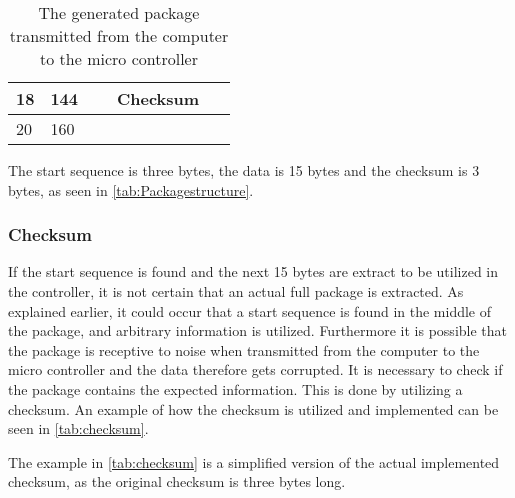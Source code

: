 \begin{table}[H]
\begin{tabular}{llclllllllllllllll}
\multicolumn{1}{|l|}{18}   & \multicolumn{1}{l|}{144} & \multicolumn{16}{c|}{Checksum}                                                                                                                                                                                                                                                                                                                                                                                      \\ \hline
\multicolumn{1}{|l|}{20}   & \multicolumn{1}{l|}{160} & \multicolumn{8}{c|}{}                                                                                                                                                                                 & \multicolumn{1}{l|}{}  & \multicolumn{1}{l|}{}  & \multicolumn{1}{l|}{}   & \multicolumn{1}{l|}{}   & \multicolumn{1}{l|}{}   & \multicolumn{1}{l|}{}   & \multicolumn{1}{l|}{}   & \multicolumn{1}{l|}{}   \\ \hline
\end{tabular}
\caption{The generated package transmitted from the computer to the micro controller}
\label{tab:Packagestructure}
\end{table}

The start sequence is three bytes, the data is 15 bytes and the checksum is 3 bytes, as seen in \autoref{tab:Packagestructure}.
\subsubsection{Checksum}
If the start sequence is found and the next 15 bytes are extract to be utilized in the controller, it is not certain that an actual full package is extracted. As explained earlier, it could occur that a start sequence is found in the middle of the package, and arbitrary information is utilized. Furthermore it is possible that the package is receptive to noise when transmitted from the computer to the micro controller and the data therefore gets corrupted. It is necessary to check if the package contains the expected information. This is done by utilizing a checksum. An example of how the checksum is utilized and implemented can be seen in \autoref{tab:checksum}.  

The example in \autoref{tab:checksum} is a simplified version of the actual implemented checksum, as the original checksum is three bytes long.

